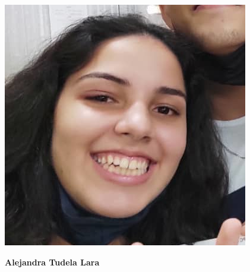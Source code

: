 \begin{minipage}{0.2\textwidth}
	\includegraphics[width=\linewidth]{img/concursantes/alejandra.png} %
\end{minipage}
\hfill
\begin{minipage}{0.7\textwidth}
	\textbf{Alejandra Tudela Lara}
	
\end{minipage}

